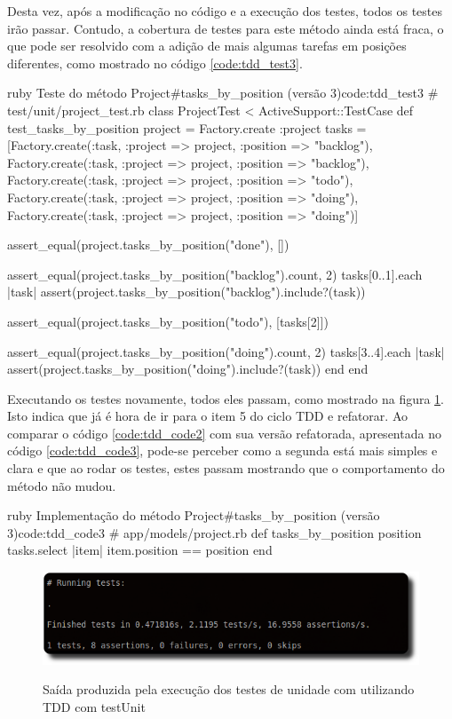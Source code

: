 Desta vez, após a modificação no código e a execução dos testes, todos os testes irão passar. Contudo, a cobertura de testes para este método ainda está fraca, o que pode ser resolvido com a adição de mais algumas tarefas em posições diferentes, como mostrado no código \ref{code:tdd_test3}.

\begin{mycode}{ruby}%
{Teste do método Project\#tasks\_by\_position (versão 3)}{code:tdd_test3}
# test/unit/project_test.rb
class ProjectTest < ActiveSupport::TestCase
  def test_tasks_by_position
    project = Factory.create :project
    tasks = [Factory.create(:task, :project => project, :position => "backlog"),
             Factory.create(:task, :project => project, :position => "backlog"),
             Factory.create(:task, :project => project, :position => "todo"),
             Factory.create(:task, :project => project, :position => "doing"),
             Factory.create(:task, :project => project, :position => "doing")]

    assert_equal(project.tasks_by_position("done"), [])

    assert_equal(project.tasks_by_position("backlog").count, 2)
    tasks[0..1].each { |task| assert(project.tasks_by_position("backlog").include?(task)) }

    assert_equal(project.tasks_by_position("todo"), [tasks[2]])

    assert_equal(project.tasks_by_position("doing").count, 2)
    tasks[3..4].each { |task| assert(project.tasks_by_position("doing").include?(task)) }
  end
end
\end{mycode}

Executando os testes novamente, todos eles passam, como mostrado na figura \ref{img:test-unit-exec}. Isto indica que já é hora de ir para o item 5 do ciclo TDD e refatorar. Ao comparar o código \ref{code:tdd_code2} com sua versão refatorada, apresentada no código \ref{code:tdd_code3}, pode-se perceber como a segunda está mais simples e clara e que ao rodar os testes, estes passam mostrando que o comportamento do método não mudou.

\begin{mycode}{ruby}%
{Implementação do método Project\#tasks\_by\_position (versão 3)}{code:tdd_code3}
# app/models/project.rb
def tasks_by_position position
  tasks.select { |item| item.position == position }
end
\end{mycode}

\begin{figure}[h]
  \center
  \caption{Saída produzida pela execução dos testes de unidade com utilizando TDD com testUnit}
  \includegraphics[scale=0.6]{images/test-unit-exec}
  \label{img:test-unit-exec}
\end{figure}

